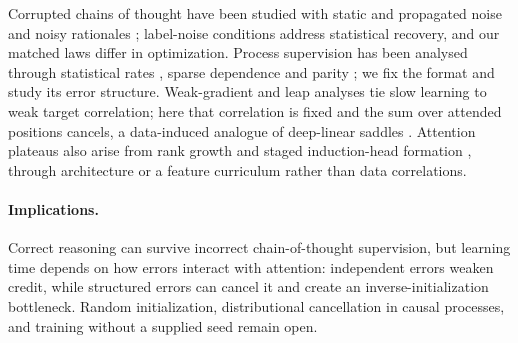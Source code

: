 Corrupted chains of thought have been studied with static and propagated noise \citep{havrilla2024noise} and noisy rationales
\citep{zhou2024noisyrationales}; label-noise conditions \citep{natarajan2013noisy,patrini2017loss} address statistical recovery, and our matched laws differ in optimization.
Process supervision \citep{nye2021scratchpads,wei2022cot,uesato2022solving,lightman2023verify} has been analysed through statistical rates
\citep{jia2025verify,hanneke2026samplecomplexityautoregressivereasoning}, sparse dependence \citep{wen2024sparse} and parity \citep{kim2024parity}; we fix the format
and study its error structure. Weak-gradient and leap analyses \citep{shalevshwartz2017failures,abbe2025parities,abbe2021staircase,abbe2023sgd} tie slow learning
to weak target correlation; here that correlation is fixed and the sum over attended positions cancels, a data-induced analogue of deep-linear saddles
\citep{saxe2014exact,shamir2019exponential}. Attention plateaus also arise from rank growth \citep{boixadsera2023rank} and staged induction-head
formation \citep{bietti2023birth,reddy2024mechanistic,edelman2024evolution}, through architecture or a feature curriculum rather than data correlations.

\paragraph{Implications.}
\label{sec:conclusion}

Correct reasoning can survive incorrect chain-of-thought supervision, but learning time depends on how errors interact with attention:
independent errors weaken credit, while structured errors can cancel it and create an inverse-initialization bottleneck. Random initialization,
distributional cancellation in causal processes, and training without a supplied seed remain open.
